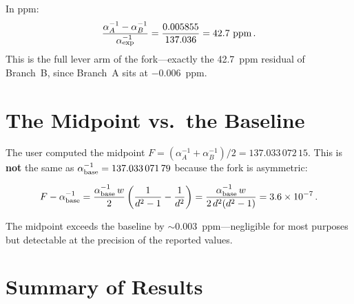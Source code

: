 \documentclass[12pt,a4paper]{article}
\begin{document}
In ppm:
\begin{equation}
\frac{\alpha^{-1}_A - \alpha^{-1}_B}{\alpha^{-1}_{\rm exp}}
= \frac{0.005855}{137.036} = 42.7\text{~ppm}\,.
\end{equation}
This is the full lever arm of the fork---exactly the 42.7~ppm residual
of Branch~B, since Branch~A sits at $-0.006$~ppm.

\section{The Midpoint vs.\ the Baseline}
\label{sec:midpoint}

The user computed the midpoint
$F = (\alpha^{-1}_A + \alpha^{-1}_B)/2 = 137.033\,072\,15$.
This is \textbf{not} the same as $\alpha^{-1}_{\rm base} = 137.033\,071\,79$
because the fork is asymmetric:

\begin{equation}
F - \alpha^{-1}_{\rm base}
= \frac{\alpha^{-1}_{\rm base}\,w}{2}
\left(\frac{1}{d^2-1} - \frac{1}{d^2}\right)
= \frac{\alpha^{-1}_{\rm base}\,w}{2\,d^2(d^2-1)}
= 3.6 \times 10^{-7}\,.
\end{equation}

The midpoint exceeds the baseline by $\sim 0.003$~ppm---negligible for
most purposes but detectable at the precision of the reported values.

\section{Summary of Results}
\label{sec:summary}
\end{document}
